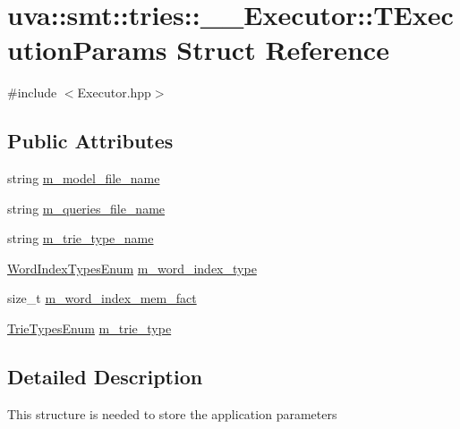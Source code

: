\hypertarget{structuva_1_1smt_1_1tries_1_1_____executor_1_1_t_execution_params}{}\section{uva\+:\+:smt\+:\+:tries\+:\+:\+\_\+\+\_\+\+Executor\+:\+:T\+Execution\+Params Struct Reference}
\label{structuva_1_1smt_1_1tries_1_1_____executor_1_1_t_execution_params}


{\ttfamily \#include $<$Executor.\+hpp$>$}

\subsection*{Public Attributes}
\begin{DoxyCompactItemize}
\item 
string \hyperlink{structuva_1_1smt_1_1tries_1_1_____executor_1_1_t_execution_params_ae281f924a9012ada41db1ab89d7ad16c}{m\+\_\+model\+\_\+file\+\_\+name}
\item 
string \hyperlink{structuva_1_1smt_1_1tries_1_1_____executor_1_1_t_execution_params_a7d7b0c09a6bb9cbdedbce7eead4b3de5}{m\+\_\+queries\+\_\+file\+\_\+name}
\item 
string \hyperlink{structuva_1_1smt_1_1tries_1_1_____executor_1_1_t_execution_params_a0cb1dd864471be7bd67e80ce7d498304}{m\+\_\+trie\+\_\+type\+\_\+name}
\item 
\hyperlink{namespaceuva_1_1smt_1_1tries_1_1dictionary_a2d9d8547b613df614eb53c510c5223af}{Word\+Index\+Types\+Enum} \hyperlink{structuva_1_1smt_1_1tries_1_1_____executor_1_1_t_execution_params_a05ef7c9283a7c09bb50ee89a7a4fc478}{m\+\_\+word\+\_\+index\+\_\+type}
\item 
size\+\_\+t \hyperlink{structuva_1_1smt_1_1tries_1_1_____executor_1_1_t_execution_params_a02e4732d4144b87c93df71893d5ea5a0}{m\+\_\+word\+\_\+index\+\_\+mem\+\_\+fact}
\item 
\hyperlink{namespaceuva_1_1smt_1_1tries_adf9a302134fb7aba4a37f68452546532}{Trie\+Types\+Enum} \hyperlink{structuva_1_1smt_1_1tries_1_1_____executor_1_1_t_execution_params_a1474b43103b59b5b646c8692a56bf953}{m\+\_\+trie\+\_\+type}
\end{DoxyCompactItemize}


\subsection{Detailed Description}
This structure is needed to store the application parameters 

